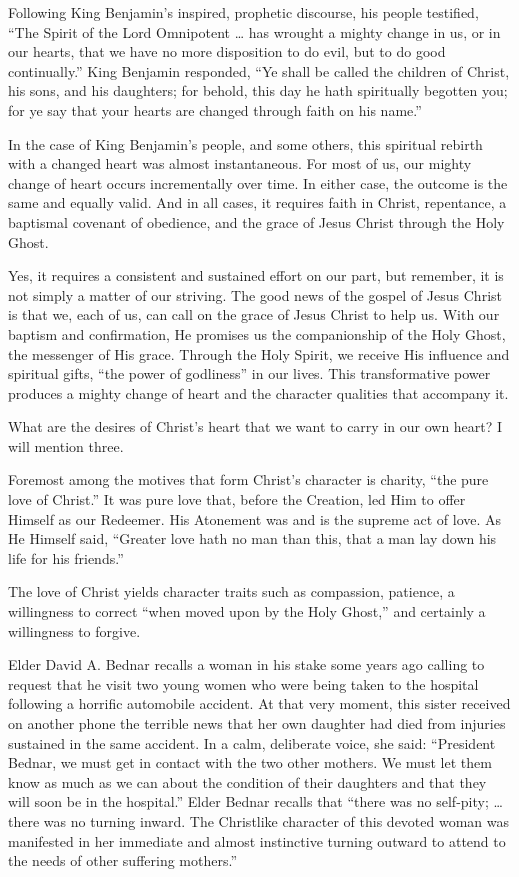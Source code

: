 \documentclass[letterpaper, 11pt]{report}
\newcommand{\intalkheader}[1]{
    \vspace{0.75em}
    \noindent{\normalsize\bfseries #1}
    \par\nopagebreak %
    \vspace{0.25em}
    \nopagebreak     %
}
\begin{document}
Following King Benjamin’s inspired, prophetic discourse, his people testified, “The Spirit of the Lord Omnipotent … has wrought a mighty change in us, or in our hearts, that we have no more disposition to do evil, but to do good continually.” King Benjamin responded, “Ye shall be called the children of Christ, his sons, and his daughters; for behold, this day he hath spiritually begotten you; for ye say that your hearts are changed through faith on his name.”

In the case of King Benjamin’s people, and some others, this spiritual rebirth with a changed heart was almost instantaneous. For most of us, our mighty change of heart occurs incrementally over time. In either case, the outcome is the same and equally valid. And in all cases, it requires faith in Christ, repentance, a baptismal covenant of obedience, and the grace of Jesus Christ through the Holy Ghost.

Yes, it requires a consistent and sustained effort on our part, but remember, it is not simply a matter of our striving. The good news of the gospel of Jesus Christ is that we, each of us, can call on the grace of Jesus Christ to help us. With our baptism and confirmation, He promises us the companionship of the Holy Ghost, the messenger of His grace. Through the Holy Spirit, we receive His influence and spiritual gifts, “the power of godliness” in our lives. This transformative power produces a mighty change of heart and the character qualities that accompany it.

\intalkheader{Christlike Motivations}

What are the desires of Christ’s heart that we want to carry in our own heart? I will mention three.

Foremost among the motives that form Christ’s character is charity, “the pure love of Christ.” It was pure love that, before the Creation, led Him to offer Himself as our Redeemer. His Atonement was and is the supreme act of love. As He Himself said, “Greater love hath no man than this, that a man lay down his life for his friends.”

The love of Christ yields character traits such as compassion, patience, a willingness to correct “when moved upon by the Holy Ghost,” and certainly a willingness to forgive.

Elder David A. Bednar recalls a woman in his stake some years ago calling to request that he visit two young women who were being taken to the hospital following a horrific automobile accident. At that very moment, this sister received on another phone the terrible news that her own daughter had died from injuries sustained in the same accident. In a calm, deliberate voice, she said: “President Bednar, we must get in contact with the two other mothers. We must let them know as much as we can about the condition of their daughters and that they will soon be in the hospital.” Elder Bednar recalls that “there was no self-pity; … there was no turning inward. The Christlike character of this devoted woman was manifested in her immediate and almost instinctive turning outward to attend to the needs of other suffering mothers.”
\end{document}
